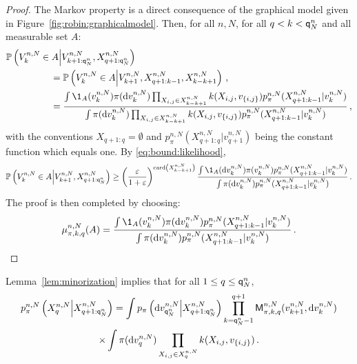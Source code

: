 \begin{proof}
The Markov property is a direct consequence of the graphical model given in Figure~\ref{fig:robin:graphicalmodel}. Then, for all $n,N$, for all $q< k < {\mathsf{q}}^{n}_{N}$ and all measurable set $A$:
\begin{align*}
\mathbb{P}\left(V^{n,N}_{k}\in A\middle|V^{n,N}_{k+1:\ordermax{n}{N}},X_{q+1:\ordermax{n}{N}}^{n,N}\right) &\\
 &\hspace{-3.2cm}= \mathbb{P}\left(V^{n,N}_{k}\in A\middle|V^{n,N}_{k+1},X^{n,N}_{q+1:k-1},X^{n,N}_{k- k+1}\right)\eqsp,\\
 &\hspace{-3.2cm}= \frac{\int \1_{A}(v^{n,N}_{k})\pi(\rmd v^{n,N}_{k})\prod_{X_{i,j}\in X^{n,N}_{k- k+1}}\condlik(X_{i,j},v_{\{i,j\}})p_{\pi}^{n,N}(X^{n,N}_{q+1:k-1}|v^{n,N}_{k})}{\int \pi(\rmd v^{n,N}_{k})\prod_{X_{i,j}\in X^{n,N}_{k- k+1}}\condlik(X_{i,j},v_{\{i,j\}})p_{\pi}^{n,N}(X^{n,N}_{q+1:k-1}|v^{n,N}_{k})}\eqsp,
\end{align*}
with the conventions $X_{q+1:q} = \emptyset$ and $p_{\pi}^{n,N}(X^{n,N}_{q+1:q}|v^{n,N}_{q+1})$ being the constant function which equals one. By \eqref{eq:bound:likelihood},
\[
\mathbb{P}\left(V^{n,N}_{k}\in A\middle|V^{n,N}_{k+1},X_{q+1:\ordermax{n}{N}}^{n,N}\right)
\ge \left(\frac{\varepsilon}{1+\varepsilon}\right)^{\card\left(X^{n,N}_{k- k+1}\right)}\frac{\int \1_{A}(\rmd v^{n,N}_{k})\pi(v^{n,N}_{k})p_{\pi}^{n,N}(X^{n,N}_{q+1:k-1}|v^{n,N}_{k})}{\int \pi(\rmd v^{n,N}_{k})p_{\pi}^{n,N}(X^{n,N}_{q+1:k-1}|v^{n,N}_{k})}\eqsp. 
\]
The proof is then completed by choosing:
\[
\mu^{n,N}_{\pi,k,q}(A) = \frac{\int \1_{A}(v^{n,N}_{k})\pi(\rmd v^{n,N}_{k})p_{\pi}^{n,N}(X^{n,N}_{q+1:k-1}|v^{n,N}_{k})}{\int \pi(\rmd v^{n,N}_{k})p_{\pi}^{n,N}(X^{n,N}_{q+1:k-1}|v^{n,N}_{k})}\eqsp. 
\]
\end{proof}
Lemma~\ref{lem:minorization} implies that for all $1\le q\le {\mathsf{q}}^{n}_{N}$,
\begin{multline*}
p_{\pi}^{n,N}\left(X^{n,N}_{q}\middle|X^{n,N}_{q+1:{\mathsf{q}}^{n}_{N}}\right) = \int p_{\pi}\left(\mathrm{d} v_{{\mathsf{q}}^{n}_{N}}^{n,N}\middle | X^{n,N}_{q+1:{\mathsf{q}}^{n}_{N}}\right) \prod_{k ={\mathsf{q}}^{n}_{N}-1}^{q+1}\mathsf{M}^{n,N}_{\pi,k,q}(v_{k+1}^{n,N},\mathrm{d} v_k^{n,N})\\
\times\int \pi(\mathrm{d} v_q^{n,N})\prod_{X_{i,j}\in X_{q}^{n,N}}k(X_{i,j},v_{\{i,j\}})\,.
\end{multline*}

